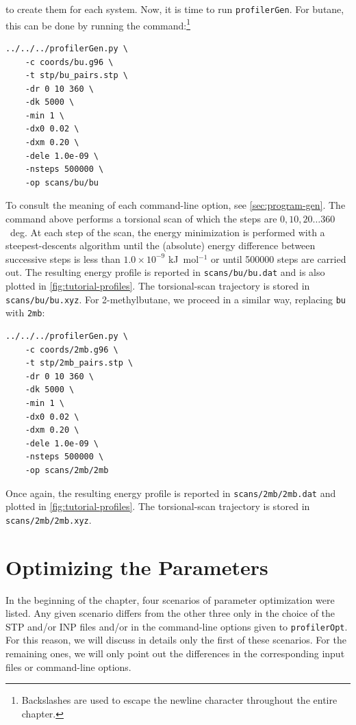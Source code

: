 \documentclass[10pt,a4paper,openany]{memoir}
\numberwithin{equation}{section}
\newcommand{\profileropt}[0]{\texttt{profilerOpt}}
\newcommand{\profilergen}[0]{\texttt{profilerGen}}
\begin{document}
\noindent to create them for each system.
%
Now, it is time to run \profilergen{}.
%
For butane, this can be done by running the command:\footnote{Backslashes are used to escape the newline character throughout the entire chapter.}

\begin{lstlisting}
../../../profilerGen.py \
    -c coords/bu.g96 \
    -t stp/bu_pairs.stp \
    -dr 0 10 360 \
    -dk 5000 \
    -min 1 \
    -dx0 0.02 \
    -dxm 0.20 \
    -dele 1.0e-09 \
    -nsteps 500000 \
    -op scans/bu/bu
\end{lstlisting}\vspace{1ex}\par

\noindent To consult the meaning of each command-line option, see
\autoref{sec:program-gen}.
%
The command above performs a torsional scan of which the steps are
$0,10,20\ldots360$~deg.
%
At each step of the scan, the energy minimization is performed with a
steepest-descents algorithm until the (absolute) energy difference
between successive steps is less than $1.0\times 10^{-9}$
kJ~mol$^{-1}$ or until 500000 steps are carried out.
%
The resulting energy profile is reported in \texttt{scans/bu/bu.dat}
and is also plotted in \autoref{fig:tutorial-profiles}.
%
The torsional-scan trajectory is stored in \texttt{scans/bu/bu.xyz}.
%
For 2-methylbutane, we proceed in a similar way, replacing \texttt{bu}
with \texttt{2mb}:

\begin{lstlisting}
../../../profilerGen.py \
    -c coords/2mb.g96 \
    -t stp/2mb_pairs.stp \
    -dr 0 10 360 \
    -dk 5000 \
    -min 1 \
    -dx0 0.02 \
    -dxm 0.20 \
    -dele 1.0e-09 \
    -nsteps 500000 \
    -op scans/2mb/2mb
\end{lstlisting}\vspace{1ex}\par

\noindent Once again, the resulting energy profile is reported in
\texttt{scans/2mb/2mb.dat} and plotted in
\autoref{fig:tutorial-profiles}.
%
The torsional-scan trajectory is stored in \texttt{scans/2mb/2mb.xyz}.
%

\section{Optimizing the Parameters}
\label{sec:tutorial-profileropt}

In the beginning of the chapter, four scenarios of parameter
optimization were listed.
%
Any given scenario differs from the other three only in the choice of
the STP and/or INP files and/or in the command-line options given to
\profileropt{}.
%
For this reason, we will discuss in details only the first of these
scenarios.
%
For the remaining ones, we will only point out the differences in the
corresponding input files or command-line options.
%
\end{document}
